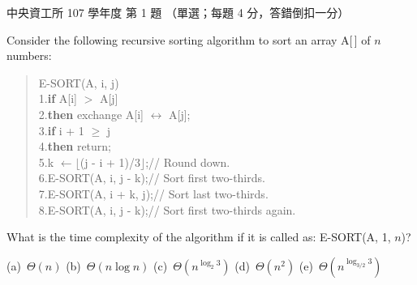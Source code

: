 \begin{pastexam}[label={px:ncu-107-dsa-01}]{中央資工所 107 學年度 第 1 題}
（單選；每題 4 分，答錯倒扣一分）

Consider the following recursive sorting algorithm to sort an array A[\,] of $n$ numbers:
\begin{quote}
E-SORT(A, i, j)\\
1.\quad \textbf{if} A[i] $>$ A[j]\\
2.\quad\quad \textbf{then} exchange A[i] $\leftrightarrow$ A[j];\\
3.\quad \textbf{if} i + 1 $\ge$ j\\
4.\quad\quad \textbf{then} return;\\
5.\quad k $\leftarrow \lfloor$(j - i + 1)/3$\rfloor$;\qquad // Round down.\\
6.\quad E-SORT(A, i, j - k);\quad // Sort first two-thirds.\\
7.\quad E-SORT(A, i + k, j);\quad // Sort last two-thirds.\\
8.\quad E-SORT(A, i, j - k);\quad // Sort first two-thirds again.
\end{quote}
What is the time complexity of the algorithm if it is called as: E-SORT(A, 1, $n$)?

(a)~$\Theta(n)$ \qquad (b)~$\Theta(n\log n)$ \qquad (c)~$\Theta(n^{\log_2 3})$ \qquad
(d)~$\Theta(n^2)$ \qquad (e)~$\Theta(n^{\log_{3/2} 3})$
\end{pastexam}

